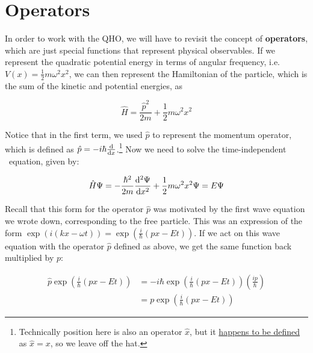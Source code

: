 \section{Operators}

In order to work with the QHO, we will have to revisit the concept of \textbf{operators}, which are just special functions that represent physical observables. 
If we represent the quadratic potential energy in terms of angular frequency, i.e. $V(x) = \frac{1}{2} m\omega^2x^2$, we can then represent the Hamiltonian of the particle, which is the sum of the kinetic and potential energies, as

\begin{tcolorbox}[title = Hamiltonian for the QHO] \vspace{-2ex}
	\begin{equation}
	\hat{H} = \frac{\hat{p}^2}{2m} + \frac{1}{2}m\omega^2x^2 \label{eq:ham-qho}
	\end{equation}
\end{tcolorbox}

Notice that in the first term, we used $\hat{p}$ to represent the momentum operator, which is defined as $\hat{p} = -i\hbar\dv{x}$.\footnote{Technically position here is also an operator $\hat{x}$, but it \href{https://physics.stackexchange.com/questions/273272/derivation-of-position-operator-in-qm}{happens to be defined} as $\hat{x} = x$, so we leave off the hat.} 
Now we need to solve the time-independent \Sch\ equation, given by:

\begin{tcolorbox}[title = \Sch\ equation for the QHO] \vspace{-2ex}
	\begin{equation}
		\hat{H}\Psi = -\frac{\hbar^2}{2m}\dv[2]{\Psi}{x} + \frac{1}{2}m\omega^2x^2\Psi = E\Psi \label{eq:se-qho}
	\end{equation}
\end{tcolorbox}

Recall that this form for the operator $\hat{p}$ was motivated by the first wave equation we wrote down, corresponding to the free particle. 
This was an expression of the form $\exp\left(i(kx-\omega t)\right) = \exp \left( \frac{i}{\hbar}(px-Et) \right)$. 
If we act on this wave equation with the operator $\hat{p}$ defined as above, we get the same function back multiplied by $p$:

\begin{align*}
	\hat{p}\exp \left(\frac{i}{\hbar}(px-Et)\right) &= -i\hbar\exp \left(\frac{i}{\hbar}(px-Et)\right) \left(\frac{ip}{\hbar}\right) \\
	&= p\exp \left(\frac{i}{\hbar}(px-Et)\right)
\end{align*}

